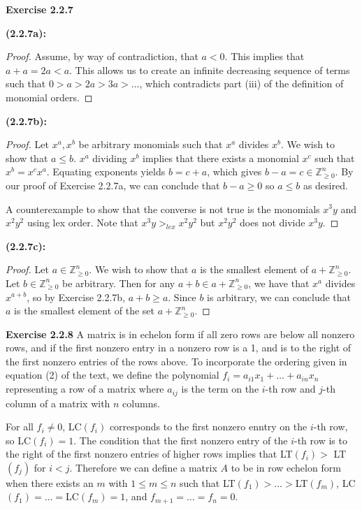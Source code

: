 \documentclass[12pt,oneside]{article}
\newenvironment{exercise}[1]{\vspace{.1in}\noindent\textbf{Exercise #1 \hspace{.05em}}}{}
\newcommand{\Z}{\mathbb{Z}}
\begin{document}
\begin{exercise}{2.2.7}

    \bigskip
    \textbf{(2.2.7a):}
    \begin{proof}
        Assume, by way of contradiction, that $a < 0$. This implies that $a+a = 2a < a$.
        This allows us to create an infinite decreasing sequence of terms such that 
        $0>a>2a>3a>\ldots$, which contradicts part (iii) of the definition of monomial orders.
    \end{proof}

    \bigskip
    \textbf{(2.2.7b):}
    \begin{proof}
        Let $x^a,x^b$ be arbitrary monomials such that $x^a$ divides $x^b$. We 
        wish to show that $a\leq b$. $x^a$ dividing $x^b$ implies that there 
        exists a monomial $x^c$ such that $x^b=x^cx^a$. Equating exponents 
        yields $b=c+a$, which gives $b-a=c \in \Z_{\geq 0}^n$. By our proof 
        of Exercise 2.2.7a, we can conclude that $b-a\geq0$ so $a\leq b$ as desired.

        A counterexample to show that the converse is not true is the monomials 
        $x^3y$ and $x^2y^2$ using lex order. Note that $x^3y >_{lex} x^2y^2$ but 
        $x^2y^2$ does not divide $x^3y$.
    \end{proof}

    \bigskip
    \textbf{(2.2.7c):}
    \begin{proof}
        Let $a \in \Z_{\geq 0}^n$. We wish to show that $a$ is the smallest 
        element of $a + \Z_{\geq 0}^n$. Let $b \in \Z_{\geq 0}^n$ be arbitrary. 
        Then for any $a+b \in a+\Z_{\geq 0}^n$, we have that $x^a$ divides $x^{a+b}$,
        so by Exercise 2.2.7b, $a+b \geq a$. Since $b$ is arbitrary, we can conclude 
        that $a$ is the smallest element of the set $a+\Z_{\geq 0}^n$.
    \end{proof}

\end{exercise}


\begin{exercise}{2.2.8}
    A matrix is in echelon form if all zero rows are below all nonzero rows, and 
    if the first nonzero entry in a nonzero row is a 1, and is to the right 
    of the first nonzero entries of the rows above. To incorporate the ordering 
    given in equation (2) of the text, we define the polynomial $f_i=a_{i1}x_1+\ldots+a_{in}x_n$ 
    representing a row of a matrix where $a_{ij}$ is the term on the $i$-th row 
    and $j$-th column of a matrix with $n$ columns. 
    
    For all $f_i \neq 0$, LC$(f_i)$
    corresponds to the first nonzero enntry on the $i$-th row, so LC$(f_i)=1$. 
    The condition that the first nonzero entry of the $i$-th row is to the right 
    of the first nonzero entries of higher rows implies that LT$(f_i) >$ LT$(f_j)$ for $i<j$. 
    Therefore we can define a matrix $A$ to be in row echelon form when there 
    exists an $m$ with $1\leq m \leq n$ such that LT$(f_1)>\ldots >$LT$(f_m)$, 
    LC$(f_1) = \ldots =$LC$(f_m)=1$, and $f_{m+1} = \ldots = f_n = 0$.
\end{exercise}
\end{document}
